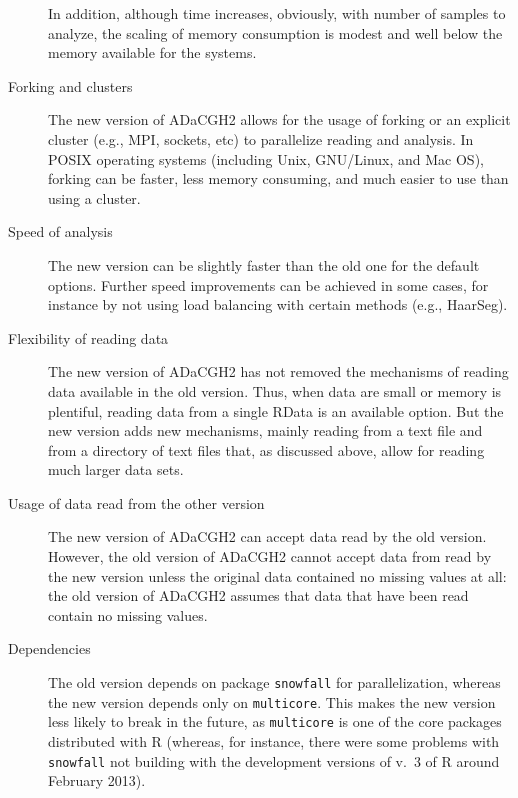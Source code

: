\documentclass[a4paper,11pt]{article}
\begin{document}
\begin{description}
 In addition, although time increases, obviously, with number of samples
  to analyze, the scaling of memory consumption is modest and well below
  the memory available for the systems.

\item[Forking and clusters] The new version of ADaCGH2 allows for the
  usage of forking or an explicit cluster (e.g., MPI, sockets, etc) to
  parallelize reading and analysis. In POSIX operating systems (including
  Unix, GNU/Linux, and Mac OS), forking can be faster, less memory
  consuming, and much easier to use than using a cluster.


\item[Speed of analysis] The new version can be slightly faster than the
  old one for the default options. Further speed improvements can be
  achieved in some cases, for instance by not using load balancing with
  certain methods (e.g., HaarSeg).

\item[Flexibility of reading data] The new version of ADaCGH2 has not
  removed the mechanisms of reading data available in the old
  version. Thus, when data are small or memory is plentiful, reading data
  from a single RData is an available option. But the new version adds new
  mechanisms, mainly reading from a text file and from a directory of text
  files that, as discussed above, allow for reading much larger data sets.

\item[Usage of data read from the other version] The new version of
  ADaCGH2 can accept data read by the old version. However, the old
  version of ADaCGH2 cannot accept data from read by the new version
  unless the original data contained no missing values at all: the old
  version of ADaCGH2 assumes that data that have been read contain no
  missing values.



\item[Dependencies] The old version depends on package \texttt{snowfall}
  for parallelization, whereas the new version depends only on
  \texttt{multicore}. This makes the new version less likely to break in
  the future, as \texttt{multicore} is one of the core packages
  distributed with R (whereas, for instance, there were some problems with
  \texttt{snowfall} not building with the development versions of v.\ 3 of
  R around February 2013).


\end{description}
\end{document}
